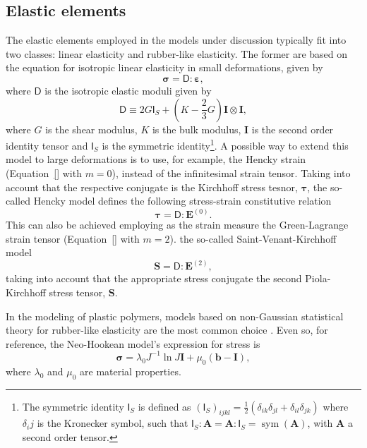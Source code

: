 \subsection{Elastic elements}

The elastic elements employed in the models under discussion typically fit into two classes: linear elasticity and rubber-like elasticity.
The former are based on the equation for isotropic linear elasticity in small deformations, given by
\begin{equation}
	\bm \sigma=\bm{\mathsf D}:\bm \varepsilon,
\end{equation}
where $\bm{\mathsf D}$ is the isotropic elastic moduli given by
\begin{equation}
\bm{\mathsf D}\equiv 2 G \bm{\mathsf I}_S+\left(K-\frac{2}{3} G\right) \mathbf I \otimes \mathbf I ,
\end{equation}
where $G$ is the shear modulus, $K$ is the bulk modulus, $\mathbf I$ is the second order identity tensor and $\bm{\mathsf I}_S$ is the symmetric identity\footnote{The symmetric identity $\bm{\mathsf I}_S$ is defined as $(\bm{\mathsf I}_S)_{ijkl} =\frac{1}{2}(\delta_{ik}\delta_{jl} + \delta_{il}\delta_{jk})$ where $\delta_ij$ is the Kronecker symbol, such that $\bm{\mathsf I}_S: \mathbf A = \mathbf A: \bm{\mathsf I}_S = \operatorname{sym} (\mathbf A)$, with $\mathbf A$ a second order tensor.}.
A possible way to extend this model to large deformations is to use, for example, the Hencky strain (Equation~\eqref{} with $m=0$), instead of the infinitesimal strain tensor.
Taking into account that the respective conjugate is the Kirchhoff stress tesnor, $\bm \tau$, the so-called Hencky model defines the following stress-strain constitutive relation
\begin{equation}
	\label{eq:hencky_model}
	\pmb \tau=\bm{\mathsf D}:\mathbf E^{(0)}.
\end{equation}
This can also be achieved employing as the strain measure the Green-Lagrange strain tensor (Equation~\eqref{} with $m=2$). the so-called Saint-Venant-Kirchhoff model
\begin{equation}
	\label{eq:saint_venant_kirchhoff}
	\mathbf S = \bm{\mathsf D}: \mathbf E^{(2)},
\end{equation}
taking into account that the appropriate stress conjugate the second Piola-Kirchhoff stress tensor, $\mathbf S$.

In the modeling of plastic polymers, models based on non-Gaussian statistical theory for rubber-like elasticity are the most common choice \citep{holzapfelNonlinearSolidMechanics2000}.
Even so, for reference, the Neo-Hookean model's expression for stress is
\begin{equation}
  \label{eq:neo_hookean_model}
	\bm \sigma = \lambda_0 J^{-1}\ln J \mathbf{I}+\mu_0\left(\mathbf{b}-\mathbf{I}\right),
\end{equation}
where $\lambda_0$ and $\mu_0$ are material properties.

